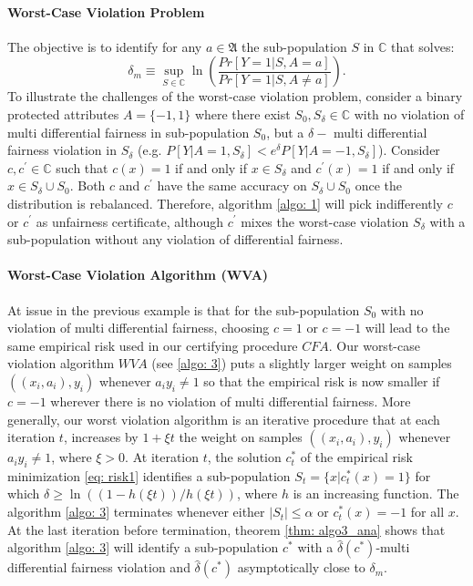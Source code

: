 \documentclass{article}
\begin{document}
\paragraph{Worst-Case Violation Problem}
The objective is to identify for any $a\in \mathfrak{A}$ the sub-population $S$ in $\mathbb{C}$ that solves:
\begin{equation}
\label{eq: wvio}
    \delta_{m} \equiv \sup_{S\in \mathbb{C}}\ln\left(\frac{Pr[Y=1|S, A=a]}{Pr[Y=1|S, A\neq a]}\right).
\end{equation}
To illustrate the challenges of the worst-case violation problem, consider a binary protected attributes $A=\{-1, 1\}$ where there exist $S_{0}, S_{\delta}\in \mathbb{C}$  with no violation of multi differential fairness in sub-population $S_{0}$, but a $\delta-$ multi differential fairness violation in $S_{\delta}$ (e.g. $P[Y| A=1, S_{\delta}] < e^{\delta}P[Y| A=-1, S_{\delta}]$).  Consider $c, c^{'}\in \mathbb{C}$ such that $c(x)=1$ if and only if $x\in S_{\delta}$ and $c^{'}(x)=1$ if and only if $x\in S_{\delta}\cup S_{0}$. Both $c$ and $c^{'}$ have the same accuracy on $S_{\delta}\cup S_{0}$ once the distribution is rebalanced. Therefore, algorithm \ref{algo: 1} will pick indifferently $c$ or $c^{'}$ as unfairness certificate, although $c^{'}$ mixes the worst-case violation $S_{\delta}$ with a sub-population without any violation of differential fairness. 

\paragraph{Worst-Case Violation Algorithm (WVA)}
At issue in the previous example is that for the sub-population $S_{0}$  with no violation of multi differential fairness, choosing $c=1$ or $c=-1$ will lead to the same empirical risk used in our certifying procedure $CFA$. Our worst-case violation algorithm $WVA$ (see \ref{algo: 3}) puts a slightly larger weight on samples $((x_{i}, a_{i}), y_{i})$ whenever $a_{i}y_{i}\neq 1$ so that the empirical risk is now smaller if $c=-1$ wherever there is no violation of multi differential fairness.  More generally, our worst violation algorithm is an iterative procedure that at each iteration $t$, increases by $1 + \xi t$ the weight on samples $((x_{i}, a_{i}), y_{i})$ whenever $a_{i}y_{i}\neq 1$, where $\xi > 0$.  At iteration $t$, the solution $c_{t}^{*}$ of the empirical risk minimization \eqref{eq: risk1} identifies a sub-population $S_{t}=\{x| c_{t}^{*}(x)=1\}$ for which $\delta \geq \ln((1 - h(\xi t))/h(\xi t))$, where $h$ is an increasing function. The algorithm \ref{algo: 3} terminates whenever either $|S_{t}|\leq \alpha$ or $c^{*}_{t}(x)=-1$ for all $x$. At the last iteration before termination, theorem \ref{thm: algo3_ana} shows that algorithm \ref{algo: 3} will identify a sub-population $c^{*}$ with a $\widehat{\delta}(c^{*})$-multi differential fairness violation and  $\widehat{\delta}(c^{*})$ asymptotically close to $\delta_{m}$. 
\end{document}
